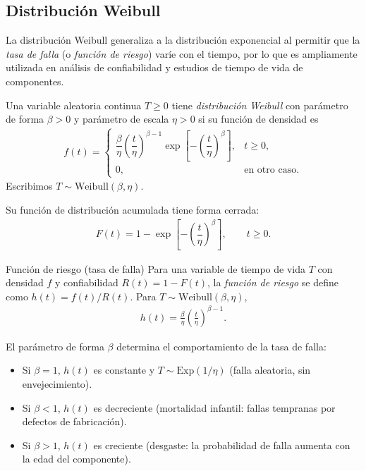 \subsection{Distribución Weibull}

La distribución Weibull generaliza a la distribución exponencial al permitir que la
\emph{tasa de falla} (o \emph{función de riesgo}) varíe con el tiempo, por lo que es
ampliamente utilizada en análisis de confiabilidad y estudios de tiempo de vida de
componentes.

\begin{definicion}
Una variable aleatoria continua $T \geq 0$ tiene \emph{distribución Weibull} con
parámetro de forma $\beta > 0$ y parámetro de escala $\eta > 0$ si su función de
densidad es
\begin{align}
 \label{eq:2.8.18}
 f(t) =
 \begin{cases}
  \dfrac{\beta}{\eta}\left(\dfrac{t}{\eta}\right)^{\beta-1}
  \exp\!\left[-\left(\dfrac{t}{\eta}\right)^{\beta}\right], & t \geq 0, \\
  0, & \text{en otro caso.}
 \end{cases}
\end{align}
Escribimos $T \sim \text{Weibull}(\beta,\eta)$.
\end{definicion}

Su función de distribución acumulada tiene forma cerrada:
\begin{align}
 \label{eq:2.8.19}
 F(t) = 1 - \exp\!\left[-\left(\dfrac{t}{\eta}\right)^{\beta}\right], \qquad t \geq 0.
\end{align}

{Función de riesgo (tasa de falla)} Para una variable de tiempo de vida $T$ con
densidad $f$ y confiabilidad $R(t) = 1 - F(t)$, la \emph{función de riesgo} se define
como $h(t) = f(t)/R(t)$. Para $T \sim \text{Weibull}(\beta,\eta)$,
\begin{align}
 \label{eq:2.8.20}
 h(t) = \frac{\beta}{\eta}\left(\frac{t}{\eta}\right)^{\beta-1}.
\end{align}

\begin{observacion}
El parámetro de forma $\beta$ determina el comportamiento de la tasa de falla:
\begin{itemize}
 \item Si $\beta = 1$, $h(t)$ es constante y $T \sim \text{Exp}(1/\eta)$ (falla
 aleatoria, sin envejecimiento).
 \item Si $\beta < 1$, $h(t)$ es decreciente (mortalidad infantil: fallas tempranas por
 defectos de fabricación).
 \item Si $\beta > 1$, $h(t)$ es creciente (desgaste: la probabilidad de falla aumenta
 con la edad del componente).
\end{itemize}
\end{observacion}

